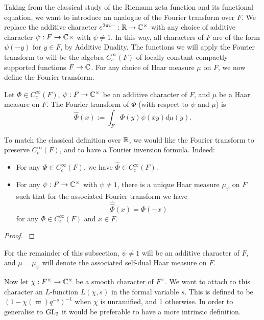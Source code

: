Taking from the classical study of the Riemann zeta function and its functional equation, we want to introduce an analogue of the Fourier transform over $F$. We replace the additive character $e^{2\pi i -}: \mathbb{R} \to \mathbb{C}^\times$ with any choice of additive character $\psi: F \to \mathbb{C}\times$ with $\psi \neq 1$. In this way, all characters of $F$ are of the form $\psi(-y)$ for $y \in F$, by Additive Duality. The functions we will apply the Fourier transform to will be the algebra $C_c^\infty(F)$ of locally constant compactly supported functions $F \to \mathbb{C}$. For any choice of Haar measure $\mu$ on $F$, we now define the Fourier transform.

\begin{defn}
    Let $\Phi \in C_c^\infty(F)$, $\psi:F \to \mathbb{C}^\times$ be an additive character of $F$, and $\mu$ be a Haar measure on $F$. The Fourier transform of $\Phi$ (with respect to $\psi$ and $\mu$) is 
    $$\hat{\Phi}(x) := \int_F \Phi(y)\psi(xy) d\mu(y).$$
\end{defn}

To match the classical definition over $\mathbb{R}$, we would like the Fourier transform to preserve $C_c^\infty(F)$, and to have a Fourier inversion formula. Indeed:

\begin{prop}
    
    \begin{itemize}
        \item For any $\Phi \in C_c^\infty(F)$, we have $\hat{\Phi} \in C_c^\infty(F)$.
        \item For any $\psi: F \to \mathbb{C}^\times$ with $\psi \neq 1$, there is a unique Haar measure $\mu_\psi$ on $F$ such that for the associated Fourier transform we have $$\hat{\hat{\Phi}}(x) = \Phi(-x)$$ for any $\Phi \in C_c^\infty(F)$ and $x \in F$.
    \end{itemize}
    
\end{prop}
\begin{proof}
    \cite[Proposition 23.1]{BH1}
\end{proof}

\begin{notn}
    For the remainder of this subsection, $\psi \neq 1$ will be an additive character of $F$, and $\mu= \mu_\psi$ will denote the associated self-dual Haar measure on $F$.
\end{notn}


Now let $\chi: F^\times \to \mathbb{C}^\times$ be a smooth character of $F^\times$. We want to attach to this character an $L$-function $L(\chi,s)$ in the formal variable $s$. This is defined to be $(1-\chi(\varpi)q^{-s})^{-1}$ when $\chi$ is unramified, and 1 otherwise. In order to generalise to $\mathrm{GL}_2$ it would be preferable to have a more intrinsic definition.

